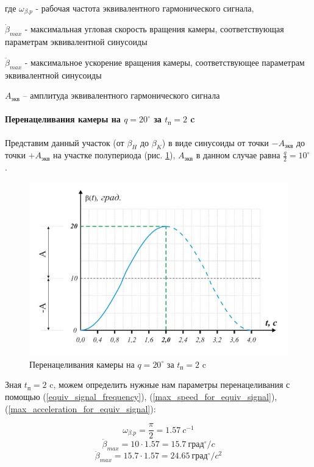 где $\omega_{\beta.p}$ - рабочая частота эквивалентного гармонического сигнала,

$\dot{\beta}_{max}$ - максимальная угловая скорость вращения камеры,
соответствующая параметрам эквивалентной синусоиды

$\ddot{\beta}_{max}$ - максимальное ускорение вращения камеры,
соответствующее параметрам эквивалентной синусоиды

$A_\text{экв}$ – амплитуда эквивалентного гармонического сигнала

\paragraph{Перенацеливания камеры на $q = 20^{\circ}$ за $t_{\text{п}} = 2$ c}

Представим данный участок (от $\beta_{H}$ до $\beta_{K}$) в виде синусоиды
от точки $-A_\text{экв}$ до точки $+A_\text{экв}$ на участке полупериода
(рис. \ref{retarget_20grad_2sec}), $A_\text{экв}$ в данном случае
равна $\frac{q}{2} = 10^{\circ}$.

\begin{figure}[h!]
    \centering
    \includegraphics[keepaspectratio]{./src/pictures/retarget_equivalent_input_signals/20grad_2sec}
    \caption{Перенацеливания камеры на $q = 20^{\circ}$ за $t_\text{п} = 2$ c}
    \label{retarget_20grad_2sec}
\end{figure}

Зная $t_{\text{п} } = 2$ c, можем определить нужные нам параметры перенацеливания
с помощью (\ref{equiv_signal_frequency}),
(\ref{max_speed_for_equiv_signal}),
(\ref{max_acceleration_for_equiv_signal}):

$$
    \omega_{\beta.p} = \frac{\pi}{2} = 1.57 ~c^{-1}
$$
$$
    \dot{\beta}_{max} = 10 \cdot 1.57 = 15.7 ~\text{град}^{\circ} / c
$$
$$
    \ddot{\beta}_{max} = 15.7 \cdot 1.57 = 24.65 ~\text{град}^{\circ} / c^{2}
$$
